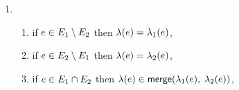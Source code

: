 \begin{enumerate}[topsep=0pt,label=(\textsc{s}\arabic*),ref=\textsc{s}\arabic*]
\item[] \setcounter{enumi}{\value{lambda}} 
  \begin{enumerate}[leftmargin=0pt]
  \item \label{seq-lambda-merge1}
    if $e\in E_1\setminus E_2$ then $\lambda(e)=\lambda_1(e)$,
  \item \label{seq-lambda-merge2}
    if $e\in E_2\setminus E_1$ then $\lambda(e)=\lambda_2(e)$,
  \item \label{seq-lambda-merge12}
    if $e\in E_1\cap E_2$ then $\labeling(\aEv)\in \fmerge{\labeling_1(\aEv)}{\labeling_2(\aEv)}$,
  \end{enumerate}
\end{enumerate}


\endinput
\subsection{Generalized access modes}
This is an option.

